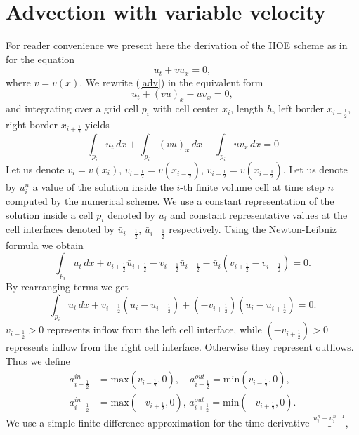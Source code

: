 \documentclass[../include.tex]{subfiles}
\begin{document}
\section{Advection with variable velocity}

For reader convenience we present here the derivation of the IIOE scheme as in \cite{iioe0,iioe1,iioe2012,iioe2} for the equation
\begin{equation}
	u_t + vu_x = 0, 
	\label{adv}
\end{equation}
where $ v = v(x) $. We rewrite (\ref{adv}) in the equivalent form
\begin{equation}
	u_t + (vu)_x - uv_x = 0,
	\label{adv1}
\end{equation}
and integrating over a grid cell $ p_i $ with cell center $ x_i $, length $ h $, left border $ x_{i-\frac{1}{2}} $, right border $ x_{i+\frac{1}{2}} $ yields
\[ \int_{p_i} u_t\, dx + 
\int_{p_i}(vu)_x\, dx - 
\int_{p_i} uv_x\, dx = 0\]
Let us denote $ v_i = v(x_i) $, $ v_{i - \frac{1}{2}} = v(x_{i-\frac{1}{2}}) $, $ v_{i + \frac{1}{2}} = v(x_{i+\frac{1}{2}}) $. Let us denote by $ u_i^n $ a value of the solution inside the $ i $-th finite volume cell at time step $ n $ computed by the numerical scheme. We use a constant representation of the solution inside a cell $ p_i $ denoted by $ \bar u_i $ and constant representative values at the cell interfaces denoted by $ \bar u_{i - \frac{1}{2}} $, $ \bar u_{i + \frac{1}{2}} $ respectively. Using the Newton-Leibniz formula we obtain
\[ \int_{p_i} u_t\, dx +
v_{i + \frac{1}{2}} \bar u_{i + \frac{1}{2}} - v_{i - \frac{1}{2}} \bar u_{i - \frac{1}{2}} - 
\bar u_i (v_{i + \frac{1}{2}} - v_{i - \frac{1}{2}}) = 0. \]
By rearranging terms we get
\[\int_{p_i} u_t\, dx + 
v_{i - \frac{1}{2}}(\bar u_i - \bar u_{i - \frac{1}{2}}) + (-v_{i + \frac{1}{2}})(\bar u_i - \bar u_{i + \frac{1}{2}}) = 0.\]
$ v_{i - \frac{1}{2}} > 0 $ represents inflow from the left cell interface, while $ (-v_{i + \frac{1}{2}}) > 0 $ represents inflow from the right cell interface. Otherwise they represent outflows. Thus we define
\begin{align}
	a^{in}_{i-\frac{1}{2}} &= \textrm{max}(v_{i-\frac{1}{2}},0),\quad 
	a^{out}_{i-\frac{1}{2}} = \textrm{min}(v_{i-\frac{1}{2}},0), 
	\\
	a^{in}_{i+\frac{1}{2}} &= \textrm{max}(-v_{i+\frac{1}{2}},0),\, 
	a^{out}_{i+\frac{1}{2}} = \textrm{min}(-v_{i+\frac{1}{2}},0). 
\end{align}
We use a simple finite difference approximation for the time derivative $ \frac{u^n_i - u^{n-1}_i}{\tau} $,
\end{document}
